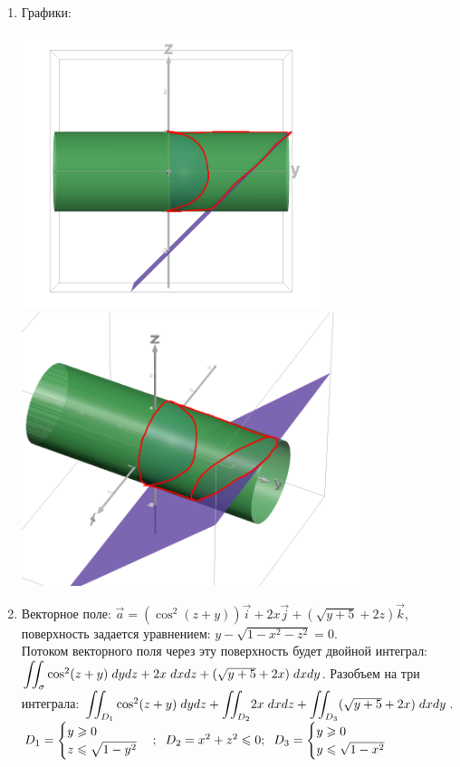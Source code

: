 \begin{enumerate}
	\item Графики:

        		\includegraphics[height=80mm]{images/5_1a}
		\includegraphics[height=80mm]{images/5_1b}

	\item Векторное поле: $\overrightarrow{a} = (\cos^2(z + y))\overrightarrow{i} + 2x\overrightarrow{j} + \left(\sqrt{y + 5} + 2z\right) \overrightarrow{k}$, поверхность задается уравнением: $y - \sqrt{1 - x^2 - z^2} = 0$.\\
Потоком векторного поля через эту поверхность будет двойной интеграл: ${\displaystyle \iint_\sigma} \cos^2(z+y)\hspace{1mm}dy dz + 2x\hspace{1mm}dx dz + (\sqrt{y + 5} + 2x)\hspace{1mm}dx dy$. Разобъем на три интеграла: ${\displaystyle \iint_{D_1}} \cos^2(z+y)\hspace{1mm}dy dz + {\displaystyle \iint_{D_2}}2x\hspace{1mm}dx dz + {\displaystyle \iint_{D_3}}(\sqrt{y + 5} + 2x)\hspace{1mm}dx dy$. $D_1 = \begin{cases} y \geqslant 0 \\ z \leqslant \sqrt{1 - y^2} \end{cases}; \hspace{2mm} D_2 =  x^2 + z^2 \leqslant 0; \hspace{2mm} D_3 = \begin{cases} y \geqslant 0 \\ y \leqslant \sqrt{1 - x^2} \end{cases}\\$


\end{enumerate}
